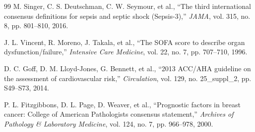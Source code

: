 \documentclass[3p,times,procedia]{elsarticle}
\theoremstyle{definition}
\begin{document}
\begin{thebibliography}{99}
M. Singer, C. S. Deutschman, C. W. Seymour, et al.,
``The third international consensus definitions for sepsis and septic shock (Sepsis-3),''
\textit{JAMA},
vol. 315, no. 8, pp. 801--810, 2016.

J. L. Vincent, R. Moreno, J. Takala, et al.,
``The SOFA score to describe organ dysfunction/failure,''
\textit{Intensive Care Medicine},
vol. 22, no. 7, pp. 707--710, 1996.

D. C. Goff, D. M. Lloyd-Jones, G. Bennett, et al.,
``2013 ACC/AHA guideline on the assessment of cardiovascular risk,''
\textit{Circulation},
vol. 129, no. 25\_suppl\_2, pp. S49--S73, 2014.

P. L. Fitzgibbons, D. L. Page, D. Weaver, et al.,
``Prognostic factors in breast cancer: College of American Pathologists consensus statement,''
\textit{Archives of Pathology \& Laboratory Medicine},
vol. 124, no. 7, pp. 966--978, 2000.

\end{thebibliography}
\end{document}
